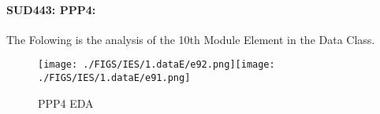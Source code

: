 \documentclass[12pt]{extreport}
\begin{document}
\paragraph{\large SUD443: PPP4:}
The Folowing is the analysis of the 10th Module Element in the Data Class.

\begin{figure}[H]
	\centering
	\texttt{[image: ./FIGS/IES/1.dataE/e92.png]}\texttt{[image: ./FIGS/IES/1.dataE/e91.png]}
	\caption{PPP4 EDA}
	\label{fig:15}
\end{figure}




\begin{comment}

The numbers Below and the boxplots above show that in this element  PSI and TSI students performance is roughly equivalent
and that their performance is almost better than half of the MP students.

\begin{enumerate}
	\item The MP Class Box-Plot:
	\begin{enumerate}
		\item MAX = 18.5 {} {} {} {} {} {} {} {}  UQ = 18 {} {} {} {} {} {} {} {}  Median = 17
		\item LQ = 16 {} {} {} {} {} {} {} {}  MIN = 13 {} {} {} {} {} {} {} {} IQR = 18 - 16 = 2	
	\end{enumerate}
	\item The PSI Class Box-Plot:
	\begin{enumerate}
		\item MAX = 18.5 {} {} {} {} {} {} {} {} UQ = 18 {} {} {} {} {} {} {} {} Median = 17.25	
		\item LQ = 15 {} {} {} {} {} {} {} {} MIN =	13 {} {} {} {} {} {} {} {} IQR = 18 - 15 = 3	
	\end{enumerate}
	\item The TSI Class Box-Plot:
	\begin{enumerate}
		\item MAX = 18.5 {} {} {} {} {} {} {} {} UQ = 17 {} {} {} {} {} {} {} {} Median = 14.75		
		\item LQ = 10.75 {} {} {} {} {} {} {} {} MIN = 10 {} {} {} {} {} {} {} {} IQR = 17 - 10.75 = 6.25
	\end{enumerate}
\end{enumerate}

\subparagraph{Interpretation of the histogram:}
This Frequency Distribution is (Skeness) with the following descriptive statistics:

\begin{enumerate}
	\item Mean = 16.15
	\item STD = 2.34
	\item Range = 18.5 - 10 = 8.5
	\item IQR = 18 - 15.5 = 2.5
\end{enumerate}

\end{comment}
\end{document}
